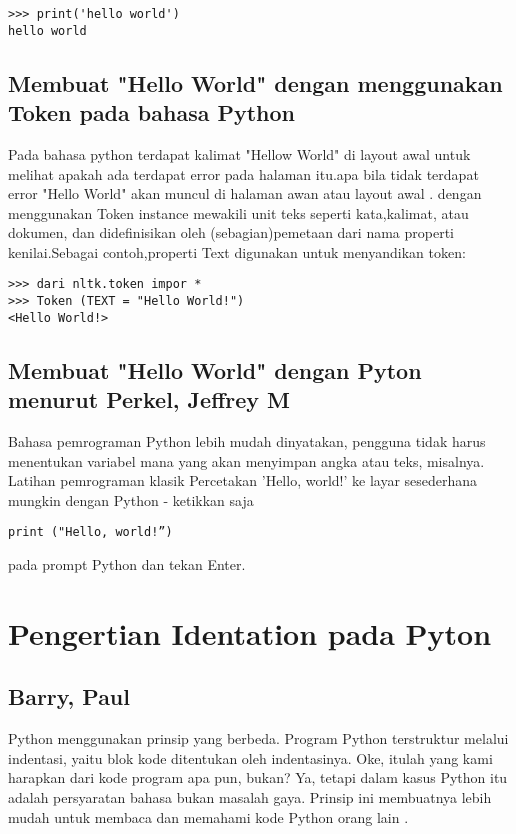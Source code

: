 \documentclass[12pt]{article}
\begin{document}
\begin{verbatim}
>>> print('hello world')
hello world
\end{verbatim}

\subsection{Membuat "Hello World" dengan menggunakan Token pada bahasa Python}
Pada bahasa python terdapat kalimat "Hellow World" di layout awal untuk melihat apakah ada terdapat error pada halaman itu.apa bila tidak terdapat error "Hello World" akan muncul di halaman awan atau layout awal . dengan menggunakan Token instance mewakili unit teks seperti kata,kalimat, atau dokumen, dan didefinisikan oleh (sebagian)pemetaan dari nama properti kenilai.Sebagai contoh,properti Text digunakan untuk menyandikan token\cite{bird2004nltk}:

\begin{verbatim}
>>> dari nltk.token impor *
>>> Token (TEXT = "Hello World!")
<Hello World!>
\end{verbatim}

\subsection{Membuat "Hello World" dengan Pyton menurut Perkel, Jeffrey M}
Bahasa pemrograman Python lebih mudah dinyatakan, pengguna tidak harus menentukan variabel mana yang akan menyimpan angka atau teks, misalnya. Latihan pemrograman klasik Percetakan 'Hello, world!' ke layar sesederhana mungkin dengan Python - ketikkan saja

\begin{verbatim}
print ("Hello, world!”)
\end{verbatim}
pada prompt Python dan tekan Enter\cite{perkel2015programming}.


\section{Pengertian Identation pada Pyton}

\subsection{Barry, Paul}
Python menggunakan prinsip yang berbeda. Program Python terstruktur melalui indentasi, yaitu blok kode ditentukan oleh indentasinya. Oke, itulah yang kami harapkan dari kode program apa pun, bukan? Ya, tetapi dalam kasus Python itu adalah persyaratan bahasa bukan masalah gaya. Prinsip ini membuatnya lebih mudah untuk membaca dan memahami kode Python orang lain \cite{barry2016head}.
\end{document}
